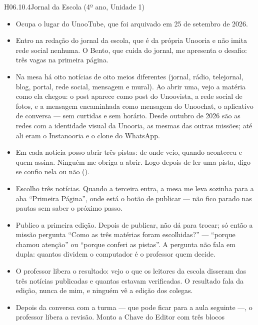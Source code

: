 \begin{historia}{H06.10.4}{Jornal da Escola (4º ano, Unidade 1)}{\parcial}
\aceite
\begin{itemize}
  \item Ocupa o lugar do UnooTube, que foi arquivado em 25 de setembro de 2026.
  \item Entro na redação do jornal da escola, que é da própria Unooria e não
    imita rede social nenhuma. O Bento, que cuida do jornal, me apresenta o
    desafio: três vagas na primeira página.
  \item Na mesa há oito notícias de oito meios diferentes (jornal, rádio,
    telejornal, blog, portal, rede social, mensagem e mural). Ao abrir uma, vejo
    a matéria como ela chegou: o post aparece como post do Unoovista, a rede
    social de fotos, e a mensagem encaminhada como mensagem do Unoochat, o
    aplicativo de conversa --- sem curtidas e sem horário. Desde outubro de 2026
    são as redes com a identidade visual da Unooria, as mesmas das outras
    missões; até ali eram o Instanooria e o clone do WhatsApp.
  \item Em cada notícia posso abrir três pistas: de onde veio, quando aconteceu
    e quem assina. Ninguém me obriga a abrir. Logo depois de ler uma pista, digo
    se confio nela ou não ().
  \item Escolho três notícias. Quando a terceira entra, a mesa me leva sozinha
    para a aba \enquote{Primeira Página}, onde está o botão de publicar --- não
    fico parado nas pautas sem saber o próximo passo.
  \item Publico a primeira edição. Depois de publicar, não dá para trocar; só
    então a missão pergunta \enquote{Como as três matérias foram
    escolhidas?} --- \enquote{porque chamou atenção} ou \enquote{porque conferi
    as pistas}. A pergunta não fala em dupla: quantos dividem o computador é o
    professor quem decide.
  \item O professor libera o resultado: vejo o que os leitores da escola
    disseram das três notícias publicadas e quantas estavam verificadas. O
    resultado fala da edição, nunca de mim, e ninguém vê a edição dos colegas.
  \item Depois da conversa com a turma --- que pode ficar para a aula seguinte
    ---, o professor libera a revisão. Monto a Chave do Editor com três blocos

\end{itemize}
\end{historia}
